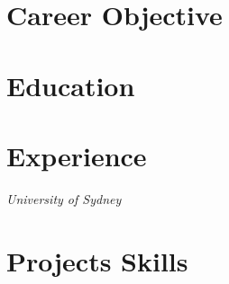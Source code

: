 \documentclass[letter, 10pt]{article}
\begin{document}
    \section{Career Objective}
    \vspace{0.25em}
    

    \section{Education}
    \vspace{0.25em}
    

    \section{Experience}
    \vspace{0.25em}
    

    \textit{University of Sydney}
    

    \section{Projects \hfill Skills}
    \vspace{0.25em}
    
\end{document}
